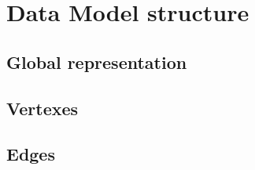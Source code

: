 \section{Data Model structure}
\subsection{Global representation}
\subsection{Vertexes}
\subsection{Edges}